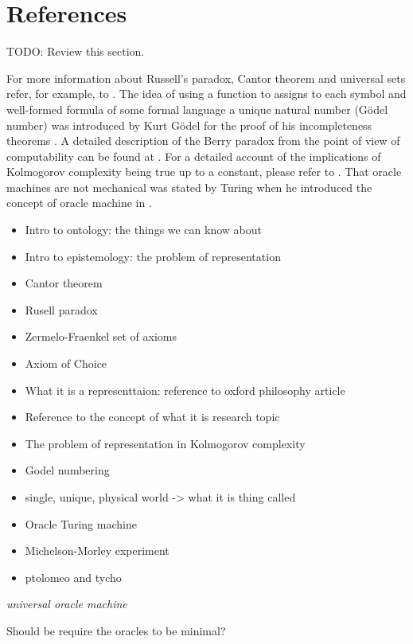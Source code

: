 %
%

\section{References}

{\color{red} TODO: Review this section.}

For more information about Russell's paradox, Cantor theorem and universal sets refer, for example, to \cite{jech2013set}. The idea of using a function to assigns to each symbol and well-formed formula of some formal language a unique natural number (Gödel number) was introduced by Kurt Gödel for the proof of his incompleteness theorems \cite{godel1931formal}. A detailed description of the Berry paradox from the point of view of computability can be found at \cite{chaitin1995berry}. For a detailed account of the implications of Kolmogorov complexity being true up to a constant, please refer to \cite{li2013introduction}. That oracle machines are not mechanical was stated by Turing when he introduced the concept of oracle machine in \cite{turing1939systems}.

\begin{itemize}
\item Intro to ontology: the things we can know about
\item Intro to epistemology: the problem of representation
\item Cantor theorem
\item Rusell paradox
\item Zermelo-Fraenkel set of axioms
\item Axiom of Choice
\item What it is a representtaion: reference to oxford philosophy article
\item Reference to the concept of what it is research topic
\item The problem of representation in Kolmogorov complexity
\item Godel numbering
\item single, unique, physical world -> what it is thing called
\item Oracle Turing machine
\item Michelson-Morley experiment


\item ptolomeo and tycho
\end{itemize}

\emph{universal oracle machine}

Should be require the oracles to be minimal?


